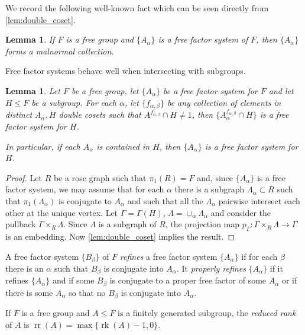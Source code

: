 \documentclass[11pt, a4paper]{amsart}
\newtheorem{lemma}[theorem]{Lemma}
\theoremstyle{definition}
\DeclareMathOperator{\rk}{rk}
\DeclareMathOperator{\rr}{rr}
\begin{document}
We record the following well-known fact which can be seen directly from \cref{lem:double_coset}.

\begin{lemma}
\label{ff_malnormal}
If $F$ is a free group and $\{A_{\alpha}\}$ is a free factor system of $F$, then $\{A_{\alpha}\}$ forms a malnormal collection.
\end{lemma}

Free factor systems behave well when intersecting with subgroups.

\begin{lemma}
\label{ff_system}
Let $F$ be a free group, let $\{A_{\alpha}\}$ be a free factor system for $F$ and let $H\leqslant F$ be a subgroup. For each $\alpha$, let $\{f_{\alpha, \beta}\}$ be any collection of elements in distinct $A_{\alpha}, H$ double cosets such that $A^{f_{\alpha, \beta}}\cap H\neq 1$, then $\{A_{\alpha}^{f_{\alpha, \beta}}\cap H\}$ is a free factor system for $H$.

In particular, if each $A_{\alpha}$ is contained in $H$, then $\{A_{\alpha}\}$ is a free factor system for $H$. 
\end{lemma}

\begin{proof}
Let $R$ be a rose graph such that $\pi_1(R) = F$ and, since $\{A_{\alpha}\}$ is a free factor system, we may assume that for each $\alpha$ there is a subgraph $\Lambda_{\alpha}\subset R$ such that $\pi_1(\Lambda_{\alpha})$ is conjugate to $A_{\alpha}$ and such that all the $\Lambda_{\alpha}$ pairwise intersect each other at the unique vertex. Let $\Gamma = \Gamma(H)$, $\Lambda = \cup_{\alpha}\Lambda_{\alpha}$ and consider the pullback $\Gamma\times_R\Lambda$. Since $\Lambda$ is a subgraph of $R$, the projection map $p_{\Gamma}\colon \Gamma\times_R\Lambda\to \Gamma$ is an embedding. Now \cref{lem:double_coset} implies the result.
\end{proof}



A free factor system $\{B_{\beta}\}$ of $F$ \emph{refines} a free factor system $\{A_{\alpha}\}$ if for each $\beta$ there is an $\alpha$ such that $B_{\beta}$ is conjugate into $A_{\alpha}$. It \emph{properly refines} $\{A_{\alpha}\}$ if it refines $\{A_{\alpha}\}$ and if some $B_{\beta}$ is conjugate to a proper free factor of some $A_{\alpha}$ or if there is some $A_{\alpha}$ so that no $B_{\beta}$ is conjugate into $A_{\alpha}$.

If $F$ is a free group and $A\leqslant F$ is a finitely generated subgroup, the \emph{reduced rank} of $A$ is $\rr(A) = \max{\{\rk(A) - 1, 0\}}$.
\end{document}
